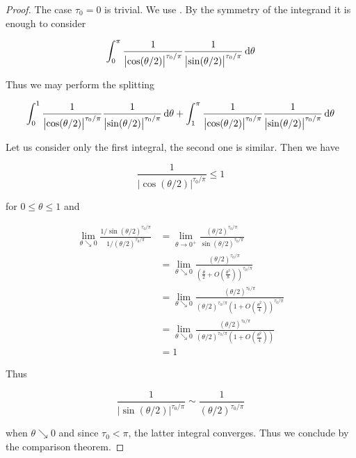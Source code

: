 \begin{proof}
	The case $\tau_0 = 0$ is trivial. We use \cite[153--154]{elstrodt:mass:2011}. By the symmetry of the integrand it is enough to consider 

	\begin{equation*}
		\int_{0}^\pi \frac{1}{\left| \cos(\theta/2) \right|^{\tau_0/\pi}}\frac{1}{\left| \sin(\theta/2) \right|^{\tau_0/\pi}} \mathop{}\!\mathrm{d} \theta
	\end{equation*}

	Thus we may perform the splitting 
	
	\begin{equation*}
		\int_{0}^1 \frac{1}{\left| \cos(\theta/2) \right|^{\tau_0/\pi}}\frac{1}{\left| \sin(\theta/2) \right|^{\tau_0/\pi}} \mathop{}\!\mathrm{d} \theta + \int_{1}^\pi \frac{1}{\left| \cos(\theta/2) \right|^{\tau_0/\pi}}\frac{1}{\left| \sin(\theta/2) \right|^{\tau_0/\pi}} \mathop{}\!\mathrm{d}\theta
	\end{equation*}
	
	Let us consider only the first integral, the second one is similar. Then we have 
	
	\begin{equation*}
		\frac{1}{\left| \cos(\theta/2) \right|^{\tau_0/\pi}} \leq 1 	\end{equation*}
	
	\noindent for $0 \leq \theta \leq 1$ and 
	
	\begin{equation*}
		\begin{aligned}
			\lim_{\theta \searrow 0}\frac{1/\sin(\theta/2)^{\tau_0/\pi}}{1/(\theta/2)^{\tau_0/\pi}} &=\lim_{\theta \to 0^+} \frac{(\theta/2)^{\tau_0/\pi}}{\sin(\theta/2)^{\tau_0/\pi}}\\ 
			&= \lim_{\theta \searrow 0} \frac{(\theta/2)^{\tau_0/\pi}}{\left(\frac{\theta}{2} + O\left(\frac{\theta^3}{8}\right)\right)^{\tau_0/\pi}}\\
			&= \lim_{\theta \searrow 0} \frac{(\theta/2)^{\tau_0/\pi}}{(\theta/2)^{\tau_0/\pi}\left(1 + O\left(\frac{\theta^2}{4}\right)\right)^{\tau_0/\pi}}\\ 
			&= \lim_{\theta \searrow 0} \frac{(\theta/2)^{\tau_0/\pi}}{(\theta/2)^{\tau_0/\pi}\left(1 + O\left(\frac{\theta^2}{4}\right)\right)}\\ 
			&= 1 
		\end{aligned}
	\end{equation*} 
	
	Thus 
	
	\begin{equation*}
		\frac{1}{\left| \sin(\theta/2) \right|^{\tau_0/\pi}} \sim\frac{1}{\left( \theta/2 \right)^{\tau_0/\pi}}
	\end{equation*}
	
	\noindent when $\theta \searrow 0$ and since $\tau_0 < \pi$, the latter integral converges. Thus we conclude by the comparison theorem.
\end{proof}

